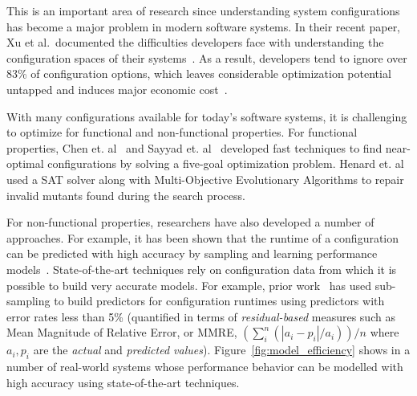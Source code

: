 This is an important area of research since understanding system configurations
has become a major problem in modern software systems. 
In their recent paper, Xu et al.\ documented the  difficulties developers face
with understanding  the configuration spaces of their systems~\cite{xu2015hey}. As a result, developers tend to ignore over 83\% of configuration options, which leaves considerable optimization potential untapped and induces major economic cost~\cite{xu2015hey}.


With many configurations available for today's software systems, it is challenging to optimize for functional and non-functional properties. For functional properties, Chen et. al~\cite{chen2016sampling} and Sayyad et. al~\cite{sayyad2013scalable} developed fast techniques to find near-optimal configurations by solving a five-goal optimization problem. Henard et. al~\cite{henard2015combining} used a SAT solver along with Multi-Objective Evolutionary Algorithms to repair invalid mutants found during the search process. 

For non-functional properties, researchers have also developed a number of approaches. For example, it has been shown that the runtime of
a configuration can be predicted with high accuracy by sampling and learning performance models~\cite{siegmund2012predicting,guo2013variability,sarkar2015cost}. 
State-of-the-art techniques rely on configuration data from which it is possible to build very accurate models. For example, prior work~\cite{nair2017faster} has used sub-sampling to build predictors for configuration runtimes using predictors with error
rates less than 5\% (quantified in terms of \emph{residual-based} measures such as Mean Magnitude of Relative Error, or  MMRE, $(\sum_i^n  (|a_i - p_i|/a_i))/n$ where $a_i,p_i$ are the
{\em actual} and {\em predicted values}).
Figure~\ref{fig:model_efficiency} shows in  a number of real-world systems 
whose performance behavior can be modelled with high accuracy using state-of-the-art techniques.

